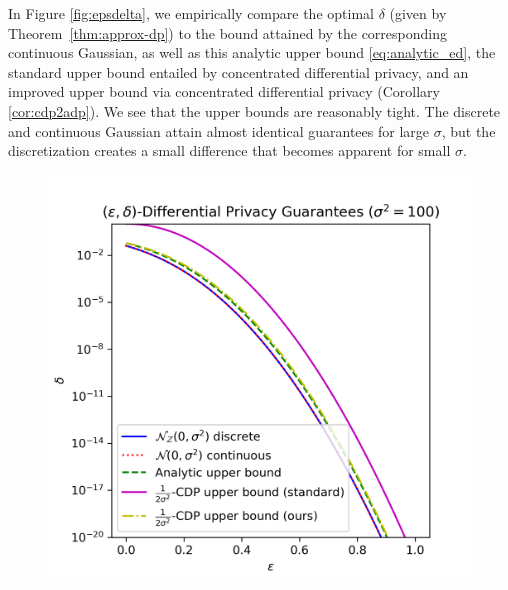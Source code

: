 \documentclass{jpcfinal} %
\begin{document}
\noindent In Figure \ref{fig:epsdelta}, we empirically compare the optimal $\delta$ (given by Theorem~\ref{thm:approx-dp}) to  the bound attained by the corresponding continuous Gaussian, as well as this analytic upper bound \eqref{eq:analytic_ed}, the standard upper bound entailed by concentrated differential privacy, and an improved upper bound via concentrated differential privacy (Corollary \ref{cor:cdp2adp}). We see that the upper bounds are reasonably tight. The discrete and continuous Gaussian attain almost identical guarantees for large $\sigma$, but the discretization creates a small difference that becomes apparent for small $\sigma$.\begin{figure}[ht!]
    \centering
    \begin{minipage}{0.5\textwidth}
        \includegraphics[width=\textwidth]{dg_epsdelta.png}
    \end{minipage}
    \hspace{-10pt}
    \begin{minipage}{0.5\textwidth}

\end{minipage}
\end{figure}
\end{document}
